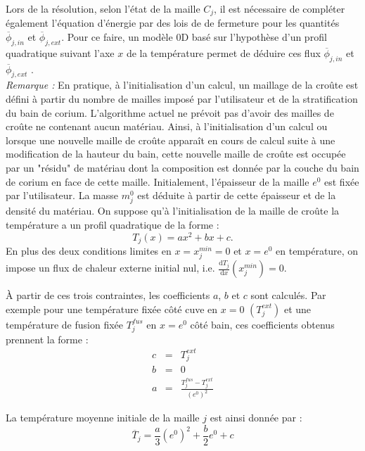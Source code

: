 Lors de la résolution, selon l'état de la maille $C_j$, il est nécessaire de compléter également l'équation d'énergie par des lois de de fermeture pour les quantités $\overline{\phi}_{j,in}$ et $\overline{\phi}_{j,ext}$. Pour ce faire, un modèle 0D basé sur l'hypothèse d'un profil quadratique suivant l'axe $x$ de la température permet de déduire ces flux $\overline{\phi}_{j,in}$ et $\overline{\phi}_{j,ext}$ \cite{LeTellier2016}.\\

{\it Remarque :}
En pratique, à l'initialisation d'un calcul, un maillage de la croûte est défini à partir du nombre de mailles imposé par l'utilisateur et de la stratification du bain de corium. L'algorithme actuel ne prévoit pas d'avoir des mailles de croûte ne contenant aucun matériau. Ainsi, à l'initialisation d'un calcul ou lorsque une nouvelle maille de croûte apparaît en cours de calcul suite à une modification de la hauteur du bain, cette nouvelle maille de croûte est occupée par un "résidu" de matériau dont la composition est donnée par la couche du bain de corium en face de cette maille. Initialement, l'épaisseur de la maille $e^0$ est fixée par l'utilisateur. La masse $m_j^0$ est déduite à partir de cette épaisseur et de la densité du matériau. On suppose qu'à l'initialisation de la maille de croûte la température a un profil quadratique de la forme : 
$$T_j(x)=ax^2+bx+c.$$
En plus des deux conditions limites en $x=x_j^{min}=0$ et $x=e^0$ en température, on impose un flux de chaleur externe initial nul, i.e. $\frac{\mathrm{d}T_j}{\mathrm{d}x}(x_j^{min}) = 0$.

À partir de ces trois contraintes, les coefficients $a$, $b$ et $c$ sont calculés. Par exemple pour une température fixée côté cuve en $x=0$ $(T_j^{ext})$ et une température de fusion fixée $T_j^{fus}$ en $x=e^0$ côté bain, ces coefficients obtenus prennent la forme :
\begin{eqnarray*}
c &=& T^{ext}_j \\
b &=& 0 \\
a &=& \frac{T_j^{fus}-T^{ext}_j}{({e^0})^2}
\end{eqnarray*}

La température moyenne initiale de la maille $j$ est ainsi donnée par :
$$\overline{T}_{j}=\frac{a}{3} ({e^0})^2 + \frac{b}{2} e^0 + c$$
